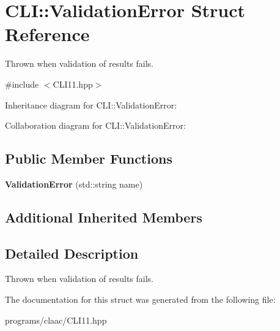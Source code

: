 \hypertarget{struct_c_l_i_1_1_validation_error}{}\section{C\+LI\+:\+:Validation\+Error Struct Reference}
\label{struct_c_l_i_1_1_validation_error}


Thrown when validation of results fails.  




{\ttfamily \#include $<$C\+L\+I11.\+hpp$>$}



Inheritance diagram for C\+LI\+:\+:Validation\+Error\+:


Collaboration diagram for C\+LI\+:\+:Validation\+Error\+:
\subsection*{Public Member Functions}
\begin{DoxyCompactItemize}
\item 
\mbox{\label{struct_c_l_i_1_1_validation_error_ae1e2233b5668b07af2c96b9ff7d02a5a}} 
{\bfseries Validation\+Error} (std\+::string name)
\end{DoxyCompactItemize}
\subsection*{Additional Inherited Members}


\subsection{Detailed Description}
Thrown when validation of results fails. 

The documentation for this struct was generated from the following file\+:\begin{DoxyCompactItemize}
\item 
programs/claac/C\+L\+I11.\+hpp\end{DoxyCompactItemize}
